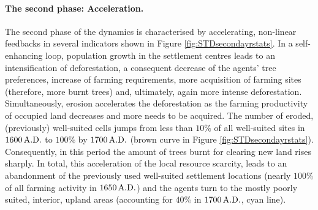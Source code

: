 \paragraph{The second phase: Acceleration.}
The second phase of the dynamics is characterised by accelerating, non-linear feedbacks in several indicators shown in Figure \ref{fig:STDsecondayrstats}.
In a self-enhancing loop, population growth in the settlement centres leads to an intensification of deforestation, a consequent decrease of the agents' tree preferences, increase of farming requirements, more acquisition of farming sites (therefore, more burnt trees) and, ultimately, again more intense deforestation.
Simultaneously, erosion accelerates the deforestation as the farming productivity of occupied land decreases and  more needs to be acquired.
The number of eroded, (previously) well-suited cells jumps from less than $10\%$ of all well-suited sites in $1600\,{\rm A.D.}$ to $100\%$ by $1700\, {\rm A.D.}$ (brown curve in Figure \ref{fig:STDsecondayrstats}).
Consequently, in this period the amount of trees burnt for clearing new land rises sharply. %
In total, this acceleration of the local resource scarcity, leads to an abandonment of the previously used well-suited settlement locations (nearly $100\%$ of all farming activity in $1650\,{\rm A.D.}$) and the agents turn to the mostly poorly suited, interior, upland areas (accounting for $40\%$ in $1700\,{\rm A.D.}$, cyan line).

